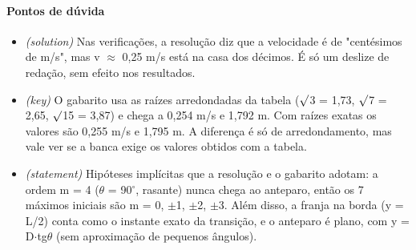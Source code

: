 \documentclass{article}%
\begin{document}
\paragraph{Pontos de dúvida}%
\begin{itemize}%
\item%
\textit{(solution)} Nas verificações, a resolução diz que a velocidade é de "centésimos de m/s", mas v $\approx$ 0,25 m/s está na casa dos décimos. É só um deslize de redação, sem efeito nos resultados.%
\item%
\textit{(key)} O gabarito usa as raízes arredondadas da tabela ($\surd$3 = 1,73, $\surd$7 = 2,65, $\surd$15 = 3,87) e chega a 0,254 m/s e 1,792 m. Com raízes exatas os valores são 0,255 m/s e 1,795 m. A diferença é só de arredondamento, mas vale ver se a banca exige os valores obtidos com a tabela.%
\item%
\textit{(statement)} Hipóteses implícitas que a resolução e o gabarito adotam: a ordem m = 4 ($\theta$ = 90$^\circ$, rasante) nunca chega ao anteparo, então os 7 máximos iniciais são m = 0, $\pm$1, $\pm$2, $\pm$3. Além disso, a franja na borda (y = L/2) conta como o instante exato da transição, e o anteparo é plano, com y = D$\cdot$tg$\theta$ (sem aproximação de pequenos ângulos).%
\end{itemize}%
\end{document}
